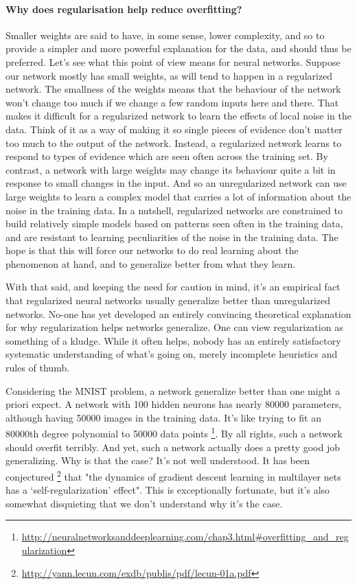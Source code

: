 \documentclass[12pt, letterpaper]{article}
\theoremstyle{definition}
\let\tb\textbf
\begin{document}
\paragraph{\tb{Why does regularisation help reduce overfitting?}} Smaller weights are said to have, in some sense, lower complexity, and so to provide a simpler and more powerful explanation for the data, and should thus be preferred. Let's see what this point of view means for neural networks. Suppose our network mostly has small weights, as will tend to happen in a regularized network. The smallness of the weights means that the behaviour of the network won't change too much if we change a few random inputs here and there. That makes it difficult for a regularized network to learn the effects of local noise in the data. Think of it as a way of making it so single pieces of evidence don't matter too much to the output of the network. Instead, a regularized network learns to respond to types of evidence which are seen often across the training set. By contrast, a network with large weights may change its behaviour quite a bit in response to small changes in the input. And so an unregularized network can use large weights to learn a complex model that carries a lot of information about the noise in the training data. In a nutshell, regularized networks are constrained to build relatively simple models based on patterns seen often in the training data, and are resistant to learning peculiarities of the noise in the training data. The hope is that this will force our networks to do real learning about the phenomenon at hand, and to generalize better from what they learn.

With that said, and keeping the need for caution in mind, it's an empirical fact that regularized neural networks usually generalize better than unregularized networks. No-one has yet developed an entirely convincing theoretical explanation for why regularization helps networks generalize. One can view regularization as something of a kludge. While it often helps, nobody has an entirely satisfactory systematic understanding of what's going on, merely incomplete heuristics and rules of thumb.

Considering the MNIST problem, a network generalize better than one might a priori expect. A network with 100 hidden neurons has nearly 80000 parameters, although having 50000 images in the training data. It's like trying to fit an 80000th degree polynomial to 50000 data points \footnote{\url{http://neuralnetworksanddeeplearning.com/chap3.html\#overfitting\_and\_regularization}}. By all rights, such a network should overfit terribly. And yet, such a network actually does a pretty good job generalizing. Why is that the case? It's not well understood. It has been conjectured \footnote{\url{http://yann.lecun.com/exdb/publis/pdf/lecun-01a.pdf}} that "the dynamics of gradient descent learning in multilayer nets has a `self-regularization' effect". This is exceptionally fortunate, but it's also somewhat disquieting that we don't understand why it's the case.
\end{document}
